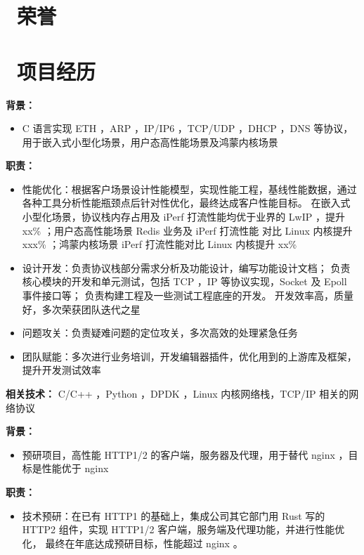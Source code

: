 \documentclass{resume}
\begin{document}
\section{\faHeartO\ 荣誉}

\section{\faGroup\ 项目经历}
\textbf{ 背景： }
\begin{itemize}
  \item C 语言实现 ETH ，ARP ，IP/IP6 ，TCP/UDP ，DHCP ，DNS 等协议，用于嵌入式小型化场景，用户态高性能场景及鸿蒙内核场景
\end{itemize}
\textbf{ 职责： }
\begin{itemize}
  \item 性能优化：根据客户场景设计性能模型，实现性能工程，基线性能数据，通过各种工具分析性能瓶颈点后针对性优化，最终达成客户性能目标。
    在嵌入式小型化场景，协议栈内存占用及 iPerf 打流性能均优于业界的 LwIP ，提升 xx\% ；用户态高性能场景 Redis 业务及 iPerf 打流性能
    对比 Linux 内核提升 xxx\% ；鸿蒙内核场景 iPerf 打流性能对比 Linux 内核提升 xx\%
  \item 设计开发：负责协议栈部分需求分析及功能设计，编写功能设计文档；
    负责核心模块的开发和单元测试，包括 TCP ，IP 等协议实现，Socket 及 Epoll 事件接口等；
    负责构建工程及一些测试工程底座的开发。
    开发效率高，质量好，多次荣获团队迭代之星
  \item 问题攻关：负责疑难问题的定位攻关，多次高效的处理紧急任务
  \item 团队赋能：多次进行业务培训，开发编辑器插件，优化用到的上游库及框架，提升开发测试效率
\end{itemize}

\textbf{ 相关技术： } C/C++ ，Python ，DPDK ，Linux 内核网络栈，TCP/IP 相关的网络协议

\textbf{ 背景： }
\begin{itemize}
  \item 预研项目，高性能 HTTP1/2 的客户端，服务器及代理，用于替代 nginx ，目标是性能优于 nginx
\end{itemize}
\textbf{ 职责： }
\begin{itemize}
  \item 技术预研：在已有 HTTP1 的基础上，集成公司其它部门用 Rust 写的 HTTP2 组件，实现 HTTP1/2 客户端，服务端及代理功能，并进行性能优化，
    最终在年底达成预研目标，性能超过 nginx 。
\end{itemize}
\end{document}
